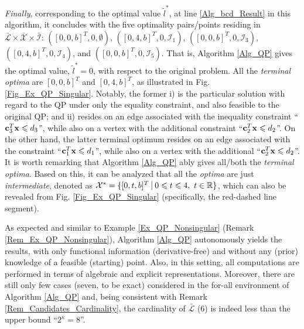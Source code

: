 \documentclass{imaman}
\newcommand{\bfc}{{\bf c}}
\newcommand{\bfx}{{\bf x}}
\newcommand{\real}{\mathbb{R}}
\newcommand{\calI}{{\mathcal I}}
\newcommand{\calL}{{\mathcal L}}
\newcommand{\calX}{{\mathcal X}}
\numberwithin{equation}{section}
\begin{document}
\begin{example}
\begin{enumerate}
\end{enumerate}

\textit{Finally}, corresponding to the optimal value $\tilde l^*$, at line \ref{Alg_bcd_Result} in this algorithm, it concludes with the five optimality pairs/points residing in $\bar\calL\times\bar\calX\times\bar\calI$: $([0,0,b]^T,0,\emptyset)$, $([0,4,b]^T,0,\calI_1)$, $([0,0,b]^T,0,\calI_3)$, $([0,4,b]^T,0,\calI_4)$, and $([0,0,b]^T,0,\calI_5)$. That is, Algorithm \ref{Alg_QP} gives the optimal value, $\tilde l^*=0$, with respect to the original problem. All the \textit{terminal optima} are $[0,0,b]^T$ and $[0,4,b]^T$, as illustrated in Fig. \ref{Fig_Ex_QP_Singular}. Notably, the former i) is the particular solution with regard to the QP under only the equality constraint, and also feasible to the original QP; and ii) resides on an edge associated with the inequality constraint ``$\bfc_3^T\bfx\le d_3$'', while also on a vertex with the additional constraint ``$\bfc_2^T\bfx\le d_2$''. On the other hand, the latter terminal optimum resides on an edge associated with the constraint ``$\bfc_1^T\bfx\le d_1$'', while also on a vertex with the additional ``$\bfc_2^T\bfx\le d_2$''. It is worth remarking that Algorithm \ref{Alg_QP} ably gives all/both the \textit{terminal optima}. Based on this, it can be analyzed that all the \textit{optima} are just \textit{intermediate}, denoted as $\calX^*=\{[0,t,b]^T~\vrule~0\le t\le 4,~t\in\real\}$, which can also be revealed from Fig. \ref{Fig_Ex_QP_Singular} (specifically, the red-dashed line segment).

\begin{remark}
As expected and similar to Example \ref{Ex_QP_Nonsingular} (Remark \ref{Rem_Ex_QP_Nonsingular}), Algorithm \ref{Alg_QP} autonomously yields the results, with only functional information (derivative-free) and without any (prior) knowledge of a feasible (starting) point. Also, in this setting, all computations are performed in terms of algebraic and explicit representations. Moreover, there are still only few cases (seven, to be exact) considered in the for-all environment of Algorithm \ref{Alg_QP} and, being consistent with Remark \ref{Rem_Candidates_Cardinality}, the cardinality of $\bar\calL$ (6) is indeed less than the upper bound ``$2^\kappa=8$''.
\end{remark}

\label{Ex_QP_Singular}
\end{example}
\end{document}
